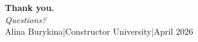 \begin{frame}{}
  \centering
  \vfill
  {\Huge\bfseries\color{mybluedark} Thank you.}\\[0.8em]
  {\Large\color{mygray}\itshape Questions?}\\[2em]
  {\small\color{mygray}
    Alina Burykina\hspace{1em}|\hspace{1em}Constructor University\hspace{1em}|\hspace{1em}April 2026}
  \vfill
\end{frame}
